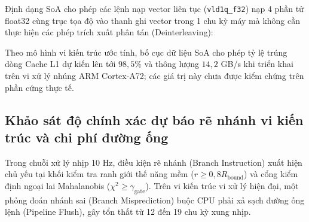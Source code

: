 Định dạng SoA cho phép các lệnh nạp vector liên tục (\texttt{vld1q\_f32}) nạp 4 phần tử float32 cùng trục tọa độ vào thanh ghi vector trong 1 chu kỳ máy mà không cần thực hiện các phép trích xuất phân tán (Deinterleaving):

\begin{table}[H]
\centering
\caption{Ước tính lý thuyết hiệu năng truy xuất bộ nhớ giữa bố cục AoS và SoA (mô hình vi kiến trúc NEON)}
\label{tab:soa-vs-aos-performance-comparison}
\end{table}

Theo mô hình vi kiến trúc ước tính, bố cục dữ liệu SoA cho phép tỷ lệ trúng dòng Cache L1 dự kiến lên tới $98{,}5\%$ và thông lượng $14{,}2$ GB/s khi triển khai trên vi xử lý nhúng ARM Cortex-A72; các giá trị này chưa được kiểm chứng trên phần cứng thực tế.

\subsection{Khảo sát độ chính xác dự báo rẽ nhánh vi kiến trúc và chi phí đường ống}

\hspace{0.5cm} Trong chuỗi xử lý nhịp 10 Hz, điều kiện rẽ nhánh (Branch Instruction) xuất hiện chủ yếu tại khối kiểm tra ranh giới thế năng mềm ($r \ge 0{,}8 R_{\text{bound}}$) và cổng kiểm định ngoại lai Mahalanobis ($\chi^2 \ge \gamma_{\text{gate}}$). Trên vi kiến trúc vi xử lý hiện đại, một phỏng đoán nhánh sai (Branch Misprediction) buộc CPU phải xả sạch đường ống lệnh (Pipeline Flush), gây tổn thất từ 12 đến 19 chu kỳ xung nhịp.

